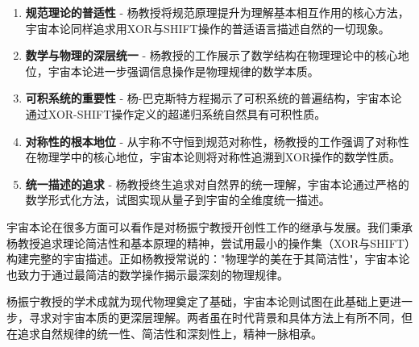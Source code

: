 \begin{enumerate}
  \item \textbf{规范理论的普适性} - 杨教授将规范原理提升为理解基本相互作用的核心方法，宇宙本论同样追求用XOR与SHIFT操作的普适语言描述自然的一切现象。

  \item \textbf{数学与物理的深层统一} - 杨教授的工作展示了数学结构在物理理论中的核心地位，宇宙本论进一步强调信息操作是物理规律的数学本质。

  \item \textbf{可积系统的重要性} - 杨-巴克斯特方程揭示了可积系统的普遍结构，宇宙本论通过XOR-SHIFT操作定义的超递归系统自然具有可积性质。

  \item \textbf{对称性的根本地位} - 从宇称不守恒到规范对称性，杨教授的工作强调了对称性在物理学中的核心地位，宇宙本论则将对称性追溯到XOR操作的数学性质。

  \item \textbf{统一描述的追求} - 杨教授终生追求对自然界的统一理解，宇宙本论通过严格的数学形式化方法，试图实现从量子到宇宙的全维度统一描述。
\end{enumerate}

宇宙本论在很多方面可以看作是对杨振宁教授开创性工作的继承与发展。我们秉承杨教授追求理论简洁性和基本原理的精神，尝试用最小的操作集（XOR与SHIFT）构建完整的宇宙描述。正如杨教授常说的："物理学的美在于其简洁性"，宇宙本论也致力于通过最简洁的数学操作揭示最深刻的物理规律。

杨振宁教授的学术成就为现代物理奠定了基础，宇宙本论则试图在此基础上更进一步，寻求对宇宙本质的更深层理解。两者虽在时代背景和具体方法上有所不同，但在追求自然规律的统一性、简洁性和深刻性上，精神一脉相承。 